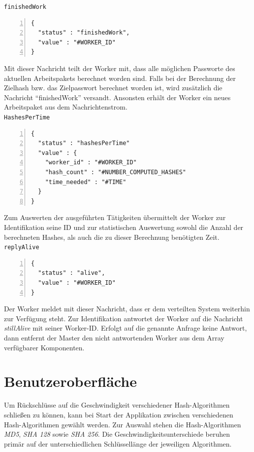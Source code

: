 \texttt{finishedWork}
\begin{lstlisting}[basicstyle=\ttfamily,numbers=left,numberstyle=\footnotesize\ttfamily,backgroundcolor=\color{sourcegray}]
{
  "status" : "finishedWork",
  "value" : "#WORKER_ID"
}
\end{lstlisting}
Mit dieser Nachricht teilt der Worker mit, dass alle möglichen Passworte des aktuellen Arbeitspakets berechnet worden sind. Falls bei der Berechnung der Zielhash bzw. das Zielpasswort berechnet worden ist, wird zusätzlich die Nachricht \enquote{finishedWork} versandt. Ansonsten erhält der Worker ein neues Arbeitspaket aus dem Nachrichtenstrom. \\

\texttt{HashesPerTime}
\begin{lstlisting}[basicstyle=\ttfamily,numbers=left,numberstyle=\footnotesize\ttfamily,backgroundcolor=\color{sourcegray}]
{
  "status" : "hashesPerTime"
  "value" : {
    "worker_id" : "#WORKER_ID"
    "hash_count" : "#NUMBER_COMPUTED_HASHES"
    "time_needed" : "#TIME"
  }
}
\end{lstlisting}
Zum Auswerten der ausgeführten Tätigkeiten übermittelt der Worker zur Identifikation seine ID und zur statistischen Auswertung sowohl die Anzahl der berechneten Hashes, als auch die zu dieser Berechnung benötigten Zeit. \\

\texttt{replyAlive}
\begin{lstlisting}[basicstyle=\ttfamily,numbers=left,numberstyle=\footnotesize\ttfamily,backgroundcolor=\color{sourcegray}]
{
  "status" : "alive",
  "value" : "#WORKER_ID"
}
\end{lstlisting}
Der Worker meldet mit dieser Nachricht, dass er dem verteilten System weiterhin zur Verfügung steht. Zur Identifikation antwortet der Worker auf die Nachricht 
\emph{stillAlive} mit seiner Worker-ID. Erfolgt auf die genannte Anfrage keine Antwort, dann entfernt der Master den nicht antwortenden Worker aus dem Array verfügbarer Komponenten.\\

\section{Benutzeroberfläche}

Um Rückschlüsse auf die Geschwindigkeit verschiedener Hash-Algorithmen schließen zu können, kann bei Start der Applikation zwischen verschiedenen Hash-Algorithmen gewählt werden. Zur Auswahl stehen die Hash-Algorithmen \emph{MD5}, \emph{SHA 128} sowie \emph{SHA 256}. Die Geschwindigkeitsunterschiede beruhen primär auf der unterschiedlichen Schlüssellänge der jeweiligen Algorithmen.

